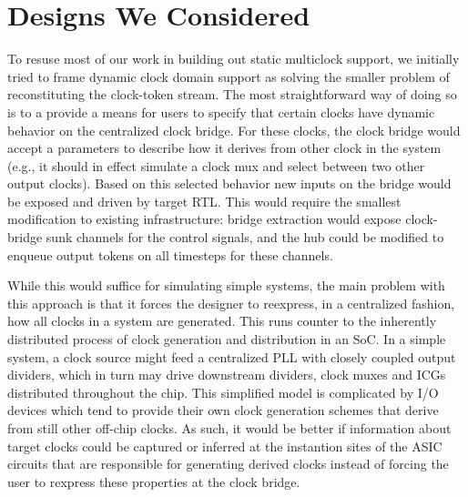 
\section{Designs We Considered}


To resuse most of our work in building out static multiclock support, we
initially tried to frame dynamic clock domain support as solving the smaller
problem of reconstituting the clock-token stream. The most straightforward way
of doing so is to a provide a means for users to specify that certain clocks
have dynamic behavior on the centralized clock bridge. For these clocks, the
clock bridge would accept a parameters to describe how it derives from other
clock in the system (e.g., it should in effect simulate a clock mux and select
between two other output clocks). Based on this selected behavior new inputs on
the bridge would be exposed and driven by target RTL. This would require the
smallest modification to existing infrastructure: bridge extraction would expose
clock-bridge sunk channels for the control signals, and the hub could be modified
to enqueue output tokens on all timesteps for these channels.

While this would suffice for simulating simple systems, the main problem with this approach is that it forces the
designer to reexpress, in a centralized fashion, how all clocks in a system are
generated. This runs counter to the inherently distributed process of clock generation and distribution in an SoC.
In a simple system, a clock source might feed a centralized PLL with closely coupled output dividers,
which in turn may drive downstream dividers, clock muxes and
ICGs distributed throughout the chip. This simplified model is complicated by I/O
devices which tend to provide their own clock generation schemes that derive from still other off-chip clocks. 
As such, it would be better if information about target clocks could be
captured or inferred at the instantion sites of the ASIC circuits that are
responsible for generating derived clocks instead of forcing the user to
rexpress these properties at the clock bridge.

